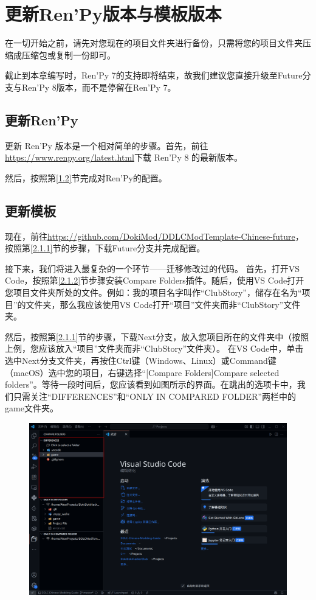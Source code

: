 \documentclass[../../Main.tex]{subfiles}
\begin{document}
\section{更新Ren'Py版本与模板版本}
在一切开始之前，请先对您现在的项目文件夹进行备份，只需将您的项目文件夹压缩成压缩包或复制一份即可。

\begin{Warning}
    截止到本章编写时，Ren'Py 7的支持即将结束，故我们建议您直接升级至Future分支与Ren'Py 8版本，而不是停留在Ren'Py 7。
\end{Warning}

\subsection{更新Ren'Py}
更新 Ren'Py 版本是一个相对简单的步骤。首先，前往\url{https://www.renpy.org/latest.html}下载 Ren'Py 8 的最新版本。

然后，按照第\ref{1.2}节完成对Ren'Py的配置。

\subsection{更新模板}
现在，前往\url{https://github.com/DokiMod/DDLCModTemplate-Chinese-future}，按照第\ref{2.1.1}节的步骤，下载Future分支并完成配置。

接下来，我们将进入最复杂的一个环节——迁移修改过的代码。
首先，打开VS Code，按照第\ref{2.1.2}节步骤安装Compare Folders插件。随后，使用VS Code打开您项目文件夹所处的文件。例如：我的项目名字叫作“ClubStory”，储存在名为“项目”的文件夹，那么我应该使用VS Code打开“项目”文件夹而非“ClubStory”文件夹。

然后，按照第\ref{2.1.1}节的步骤，下载Next分支，放入您项目所在的文件夹中（按照上例，您应该放入“项目”文件夹而非“ClubStory”文件夹）。
在VS Code中，单击选中Next分支文件夹，再按住Ctrl键（Windows、Linux）或Command键（macOS）选中您的项目，右键选择“[Compare Folders]Compare selected folders”。等待一段时间后，您应该看到如图所示的界面。在跳出的选项卡中，我们只需关注“DIFFERENCES”和“ONLY IN COMPARED FOLDER”两栏中的game文件夹。
\begin{figure}[htbp]
    \centering
    \includegraphics[scale=.2]{7.1.2.1.png}
\end{figure}
\end{document}
